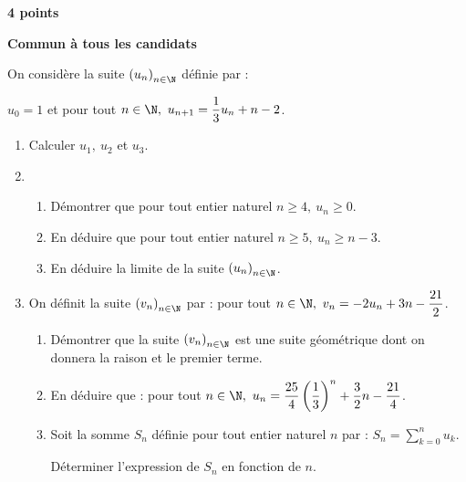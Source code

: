 \textbf{ \hfill 4 points}

\textbf{Commun à tous les candidats}
 
\medskip

On considère la suite $\left(u_{n}\right)_{n\in \N}$ définie par : 

$u_{0} = 1$ et pour tout $n \in  \N,~ u_{n+1} = \dfrac{1}{3}u_{n} + n - 2$. 

\begin{enumerate}
\item Calculer $u_{1},~u_{2}$ et $u_{3}$.
\item 
	\begin{enumerate}
		\item Démontrer que pour tout entier naturel $n \geqslant  4,~  u_{n} \geqslant 0$. 
		\item En déduire que pour tout entier naturel $n \geqslant 5,~ u_{n} \geqslant n - 3$. 
		\item En déduire la limite de la suite $\left(u_{n}\right)_{n\in \N}$. 
	\end{enumerate}
\item On définit la suite $\left(v_{n}\right)_{n\in \N}$ par : pour tout $n \in \N,~ v_{n} = -2u_{n} + 3n - \dfrac{21}{2}$. 
	\begin{enumerate}
		\item Démontrer que la suite $\left(v_{n}\right)_{n\in \N}$ est une suite géométrique dont on donnera la raison et le 
premier terme. 
		\item  	En d\'eduire que : pour tout $n \in \N,~ u_{n} =  \dfrac{25}{4}\left(\dfrac{1}{3} \right)^n + \dfrac{3}{2}n -\dfrac{21}{4}$. 
		\item  Soit la somme $S_{n}$ définie pour tout entier naturel $n$ par : $S_{n} = \displaystyle\sum_{k=0}^n u_{k}$. 

Déterminer l'expression de $S_{n}$ en fonction de $n$.
	\end{enumerate} 
\end{enumerate}